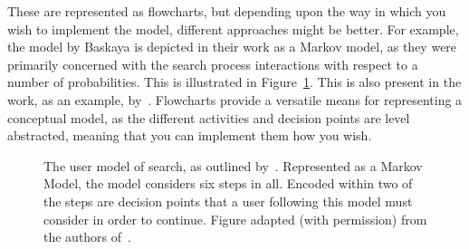 \noindent
{} These are represented as flowcharts, but depending upon the way in which you wish to implement the model, different approaches might be better. For example, the model by Baskaya is depicted in their work as a Markov model, as they were primarily concerned with the search process interactions with respect to a number of probabilities. This is illustrated in Figure~\ref{fig:baskaya_model}. This is also present in the work, as an example, by~\cite{tran2017markov_models}. Flowcharts provide a versatile means for representing a conceptual model, as the different activities and decision points are level abstracted, meaning that you can implement them how you wish.

\begin{figure}[t!]
    \centering
    \caption[Markov model of the search process by~\cite{baskaya2013behavioural_factors}]{The user model of search, as outlined by~\citealt{baskaya2013behavioural_factors}. Represented as a Markov Model, the model considers six steps in all. Encoded within two of the steps are decision points that a user following this model must consider in order to continue. Figure adapted (with permission) from the authors of~\citealt{baskaya2013behavioural_factors}.}
    \label{fig:baskaya_model}
\end{figure}

